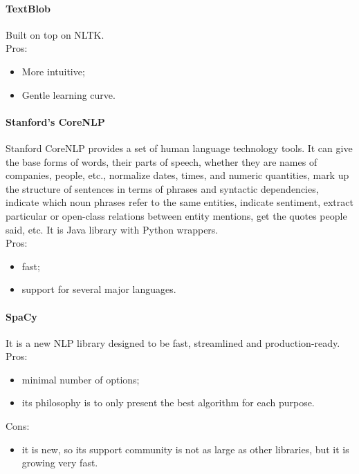\paragraph{TextBlob}
Built on top on NLTK\cite{textblob}.\\
Pros: 
\begin{itemize}
\item More intuitive; 
\item Gentle learning curve. 
\end{itemize} 

\paragraph{Stanford's CoreNLP}
Stanford CoreNLP provides a set of human language technology tools. It can give the base forms of words, their parts of speech, whether they are names of companies, people, etc., normalize dates, times, and numeric quantities, mark up the structure of sentences in terms of phrases and syntactic dependencies, indicate which noun phrases refer to the same entities, indicate sentiment, extract particular or open-class relations between entity mentions, get the quotes people said, etc.\cite{stanfordcorenlp} It is Java library with Python wrappers. \\
Pros:
\begin{itemize}
\item fast;
\item support for several major languages. 
\end{itemize}

\paragraph{SpaCy}
It is a new NLP library designed to be fast, streamlined and production-ready\cite{spacy}.\\
Pros:
\begin{itemize}
\item minimal number of options;
\item its philosophy is to only present the best algorithm for each purpose. 
\end{itemize}
Cons:
\begin{itemize}
\item it is new, so its support community is not as large as other libraries, but it is growing very fast.
\end{itemize}


